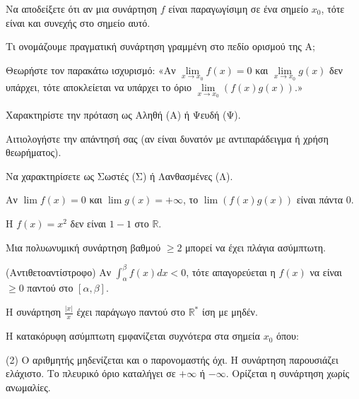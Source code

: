 \documentclass[11pt,a4paper]{article}
\newcommand{\kerkissans}[1]{{\fontfamily{maksf}\selectfont \textbf{#1}}}
\renewcommand{\textdexiakeraia}{}
\newcommand{\dint}{\displaystyle\int}
\newcommand\themanum{A}
\newcounter{thema}[section]
\renewcommand{\thethema}{\arabic{thema}}
\newcommand{\Thema}{\refstepcounter{thema}{\textbf{\textcolor{black}{\faPenSquare\ \  \large \kerkissans{\textbf{\thethemaο\hspace{2mm}Διαγώνισμα - Θέμα \themanum}}}}}\hspace{0mm}}{}
\newenvironment{thema}[1]
{\begin{tcolorbox}[title=\Thema\kerkissans{\textbf{\large{  #1}}},breakable,
enhanced standard,titlerule=0pt,toprule=0pt, rightrule=0pt, bottomrule=0pt,
colback=white,left=0mm,top=1mm,bottom=0mm,
boxrule=0pt,
colframe=white,leftrule=0mm,sharp corners,coltitle=black]
\renewcommand{\themanum}{#1}}
{\end{tcolorbox}}
\begin{document}
\begin{thema}{A}
\begin{erwthma}
    \item Να αποδείξετε ότι αν μια συνάρτηση $f$ είναι παραγωγίσιμη σε ένα σημείο $x_0$, τότε είναι και συνεχής στο σημείο αυτό.
    \item Τι ονομάζουμε πραγματική συνάρτηση γραμμένη στο πεδίο ορισμού της Α;
    \item Θεωρήστε τον παρακάτω ισχυρισμό:
    «Αν $\lim\limits_{x\to x_0} f(x) = 0$ και $\lim\limits_{x\to x_0} g(x)$ δεν υπάρχει, τότε αποκλείεται να υπάρχει το όριο $\lim\limits_{x\to x_0} (f(x)g(x))$.»
    \begin{alist}
    \item Χαρακτηρίστε την πρόταση ως Αληθή (Α) ή Ψευδή (Ψ).
    \item Αιτιολογήστε την απάντησή σας (αν είναι δυνατόν με αντιπαράδειγμα ή χρήση θεωρήματος).
    \end{alist}
    \item Να χαρακτηρίσετε ως Σωστές (Σ) ή Λανθασμένες (Λ).
    \begin{alist}
        \item Αν $\lim f(x) = 0$ και $\lim g(x) = +\infty$, το $\lim (f(x)g(x))$ είναι πάντα 0.
        \item H $f(x)=x^2$ δεν είναι $1-1$ στο $\mathbb{R}$.
        \item Μια πολυωνυμική συνάρτηση βαθμού $\ge 2$ μπορεί να έχει πλάγια ασύμπτωτη.
        \item (Αντιθετοαντίστροφο) Αν $\dint_\alpha^\beta f(x) dx < 0$, τότε απαγορεύεται η $f(x)$ να είναι $\ge 0$ παντού στο $[\alpha, \beta]$.
        \item Η συνάρτηση $\frac{|x|}{x}$ έχει παράγωγο παντού στο $\mathbb{R}^*$ ίση με μηδέν.
    \end{alist}
    \item Η κατακόρυφη ασύμπτωτη εμφανίζεται συχνότερα στα σημεία $x_0$ όπου:
    \begin{tasks}[label=\let\textdexiakeraia\relax\alph*.](2)
        \task Ο αριθμητής μηδενίζεται και ο παρονομαστής όχι.
        \task Η συνάρτηση παρουσιάζει ελάχιστο.
        \task Το πλευρικό όριο καταλήγει σε $+\infty$ ή $-\infty$.
        \task Ορίζεται η συνάρτηση χωρίς ανωμαλίες.
    \end{tasks}
\end{erwthma}
\end{thema}
\vspace{1cm}
\end{document}
